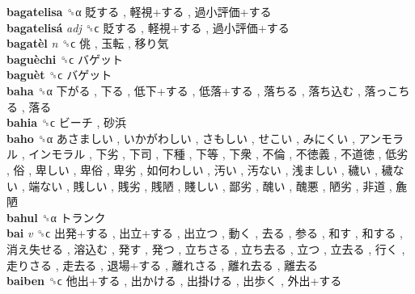 \textbf{bagatelisa} ␝α   貶する ,  軽視+する ,  過小評価+する   \\
\textbf{bagatelisá} \emph{adj}  ␝ϲ   貶する ,  軽視+する ,  過小評価+する   \\
\textbf{bagatèl} \emph{n}  ␝ϲ   佻 ,  玉転 ,  移り気   \\
\textbf{baguèchi} ␝ϲ   バゲット   \\
\textbf{baguèt} ␝ϲ   バゲット   \\
\textbf{baha} ␝α   下がる ,  下る ,  低下+する ,  低落+する ,  落ちる ,  落ち込む ,  落っこちる ,  落る   \\
\textbf{bahia} ␝ϲ   ビーチ ,  砂浜   \\
\textbf{baho} ␝α   あさましい ,  いかがわしい ,  さもしい ,  せこい ,  みにくい ,  アンモラル ,  インモラル ,  下劣 ,  下司 ,  下種 ,  下等 ,  下衆 ,  不倫 ,  不徳義 ,  不道徳 ,  低劣 ,  俗 ,  卑しい ,  卑俗 ,  卑劣 ,  如何わしい ,  汚い ,  汚ない ,  浅ましい ,  穢い ,  穢ない ,  端ない ,  賎しい ,  賎劣 ,  賎陋 ,  賤しい ,  鄙劣 ,  醜い ,  醜悪 ,  陋劣 ,  非道 ,  麁陋   \\
\textbf{bahul} ␝α   トランク   \\
\textbf{bai} \emph{v}  ␝ϲ   出発+する ,  出立+する ,  出立つ ,  動く ,  去る ,  参る ,  和す ,  和する ,  消え失せる ,  溶込む ,  発す ,  発つ ,  立ちさる ,  立ち去る ,  立つ ,  立去る ,  行く ,  走りさる ,  走去る ,  退場+する ,  離れさる ,  離れ去る ,  離去る   \\
\textbf{baiben} ␝ϲ   他出+する ,  出かける ,  出掛ける ,  出歩く ,  外出+する   \\
